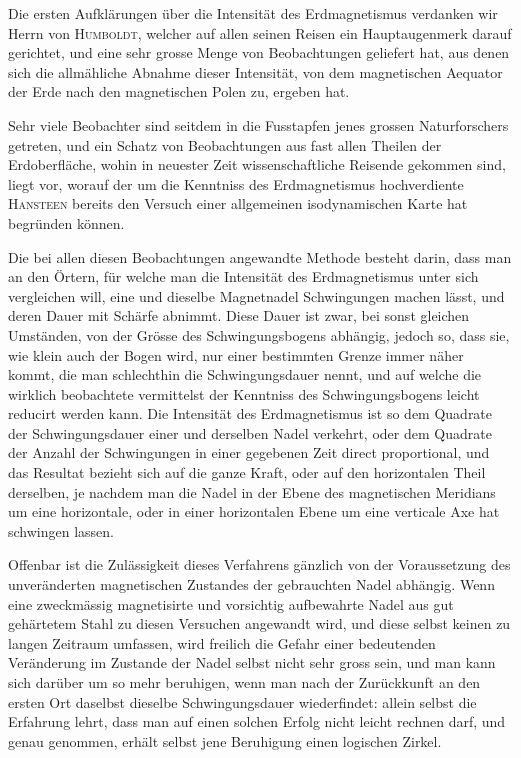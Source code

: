 \documentclass[12pt,a4paper]{article}
\begin{document}
Die ersten Aufklärungen über die Intensität des Erdmagnetismus verdanken wir Herrn von \textsc{Humboldt}, welcher auf allen seinen Reisen ein Hauptaugenmerk darauf gerichtet, und eine sehr grosse Menge von Beobachtungen geliefert hat, aus denen sich die allmähliche Abnahme dieser Intensität, von dem magnetischen Aequator der Erde nach den magnetischen Polen zu, ergeben hat.

Sehr viele Beobachter sind seitdem in die Fusstapfen jenes grossen Naturforschers getreten, und ein Schatz von Beobachtungen aus fast allen Theilen der Erdoberfläche, wohin in neuester Zeit wissenschaftliche Reisende gekommen sind, liegt vor, worauf der um die Kenntniss des Erdmagnetismus hochverdiente \textsc{Hansteen} bereits den Versuch einer allgemeinen isodynamischen Karte hat begründen können.

Die bei allen diesen Beobachtungen angewandte Methode besteht darin, dass man an den Örtern, für welche man die Intensität des Erdmagnetismus unter sich vergleichen will, eine und dieselbe Magnetnadel Schwingungen machen lässt, und deren Dauer mit Schärfe abnimmt. Diese Dauer ist zwar, bei sonst gleichen Umständen, von der Grösse des Schwingungsbogens abhängig, jedoch so, dass sie, wie klein auch der Bogen wird, nur einer bestimmten Grenze immer näher kommt, die man schlechthin die Schwingungsdauer nennt, und auf welche die wirklich beobachtete vermittelst der Kenntniss des Schwingungsbogens leicht reducirt werden kann. Die Intensität des Erdmagnetismus ist so dem Quadrate der Schwingungsdauer einer und derselben Nadel verkehrt, oder dem Quadrate der Anzahl der Schwingungen in einer gegebenen Zeit direct proportional, und das Resultat bezieht sich auf die ganze Kraft, oder auf den horizontalen Theil derselben, je nachdem man die Nadel in der Ebene des magnetischen Meridians um eine horizontale, oder in einer horizontalen Ebene um eine verticale Axe hat schwingen lassen.

Offenbar ist die Zulässigkeit dieses Verfahrens gänzlich von der Voraussetzung des unveränderten magnetischen Zustandes der gebrauchten Nadel abhängig. Wenn eine zweckmässig magnetisirte und vorsichtig aufbewahrte Nadel aus gut gehärtetem Stahl zu diesen Versuchen angewandt wird, und diese selbst keinen zu langen Zeitraum umfassen, wird freilich die Gefahr einer bedeutenden Veränderung im Zustande der Nadel selbst nicht sehr gross sein, und man kann sich darüber um so mehr beruhigen, wenn man nach der Zurückkunft an den ersten Ort daselbst dieselbe Schwingungsdauer wiederfindet: allein selbst die Erfahrung lehrt, dass man auf einen solchen Erfolg nicht leicht rechnen darf, und genau genommen, erhält selbst jene Beruhigung einen logischen Zirkel.
\end{document}
